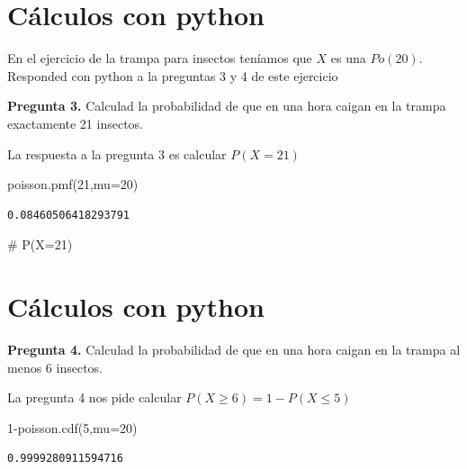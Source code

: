 \documentclass[
  letterpaper,
  DIV=11,
  numbers=noendperiod]{scrreprt}
\newenvironment{Shaded}{\begin{snugshade}}{\end{snugshade}}
\newcommand{\CommentTok}[1]{\textcolor[rgb]{0.37,0.37,0.37}{#1}}
\newcommand{\DecValTok}[1]{\textcolor[rgb]{0.68,0.00,0.00}{#1}}
\newcommand{\NormalTok}[1]{\textcolor[rgb]{0.00,0.23,0.31}{#1}}
\newcommand{\OperatorTok}[1]{\textcolor[rgb]{0.37,0.37,0.37}{#1}}
\begin{document}
\section{Cálculos con python}\label{cuxe1lculos-con-python-7}

En el ejercicio de la trampa para insectos teníamos que \(X\) es una
\(Po(20)\). Responded con python a la preguntas 3 y 4 de este ejercicio

\textbf{Pregunta 3.} Calculad la probabilidad de que en una hora caigan
en la trampa exactamente 21 insectos.

La respuesta a la pregunta 3 es calcular \(P(X=21)\)

\begin{Shaded}
\begin{Highlighting}[]
\NormalTok{poisson.pmf(}\DecValTok{21}\NormalTok{,mu}\OperatorTok{=}\DecValTok{20}\NormalTok{)}
\end{Highlighting}
\end{Shaded}

\begin{verbatim}
0.08460506418293791
\end{verbatim}

\begin{Shaded}
\begin{Highlighting}[]
\CommentTok{\# P(X=21)}
\end{Highlighting}
\end{Shaded}

\section{Cálculos con python}\label{cuxe1lculos-con-python-8}

\textbf{Pregunta 4.} Calculad la probabilidad de que en una hora caigan
en la trampa al menos 6 insectos.

La pregunta 4 nos pide calcular \(P(X\geq 6)=1-P(X\leq 5)\)

\begin{Shaded}
\begin{Highlighting}[]
\DecValTok{1}\OperatorTok{{-}}\NormalTok{poisson.cdf(}\DecValTok{5}\NormalTok{,mu}\OperatorTok{=}\DecValTok{20}\NormalTok{) }
\end{Highlighting}
\end{Shaded}

\begin{verbatim}
0.9999280911594716
\end{verbatim}
\end{document}
